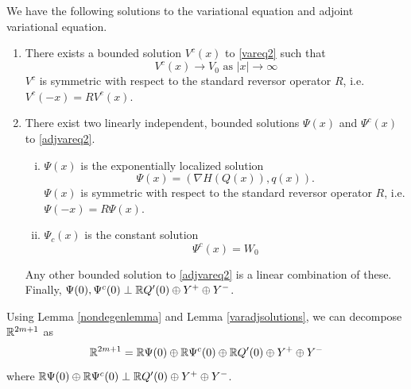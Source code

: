 \documentclass[thesis.tex]{subfiles}
\begin{document}
\begin{lemma}\label{varadjsolutions}
We have the following solutions to the variational equation and adjoint variational equation.
\begin{enumerate}
	\item There exists a bounded solution $V^c(x)$ to \eqref{vareq2} such that 
	\begin{equation}
	V^c(x) \rightarrow V_0 \text{ as }|x| \rightarrow \infty
	\end{equation}
	$V^c$ is symmetric with respect to the standard reversor operator $R$, i.e. $V^c(-x) = R V^c(x)$.

	\item There exist two linearly independent, bounded solutions $\Psi(x)$ and $\Psi^c(x)$ to \eqref{adjvareq2}.
	\begin{enumerate}[(i)]
	\item $\Psi(x)$ is the exponentially localized solution
	\begin{equation}
	\Psi(x) = (\nabla H(Q(x)), q(x)).
	\end{equation}
	$\Psi(x)$ is symmetric with respect to the standard reversor operator $R$, i.e. $\Psi(-x) = R \Psi(x)$. 
	\item $\Psi_c(x)$ is the constant solution
	\begin{equation}
	\Psi^c(x) = W_0
	\end{equation}
	\end{enumerate}
	Any other bounded solution to \eqref{adjvareq2} is a linear combination of these. Finally, $\Psi(0), \Psi^c(0) \perp \mathbb{R} Q'(0) \oplus Y^+ \oplus Y^-$.
\end{enumerate}
\end{lemma}

Using Lemma \ref{nondegenlemma} and Lemma \ref{varadjsolutions}, we can decompose $\mathbb{R}^{2m+1}$ as  
\begin{equation}
\mathbb{R}^{2m+1} = \mathbb{R} \Psi(0) \oplus \mathbb{R} \Psi^c(0) \oplus \mathbb{R} Q'(0) \oplus Y^+ \oplus Y^-
\end{equation}
where $\mathbb{R} \Psi(0) \oplus \mathbb{R} \Psi^c(0) \perp \mathbb{R} Q'(0) \oplus Y^+ \oplus Y^-$.
\end{document}
